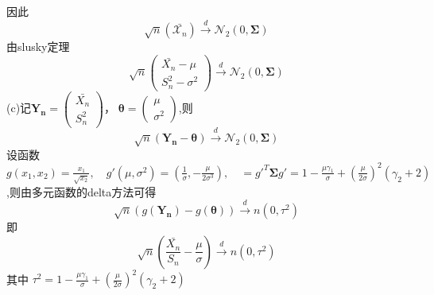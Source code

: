 \documentclass[11pt,a4paper]{ctexart}
\begin{document}
        因此\[\sqrt{n}(\bar{\mathcal{X}_n}) \overset{d}{\to} \mathcal{N}_2(0,\boldsymbol{\Sigma})\]
        由slusky定理\[\sqrt{n}\begin{pmatrix}
            \bar{X_n} - \mu\\
            S_n^2 - \sigma^2
            \end{pmatrix} \overset{d}{\to} \mathcal{N}_2(0,\boldsymbol{\Sigma})\]
        (c)记\(\boldsymbol{Y_n} = \begin{pmatrix}
                    \bar{X_n} \\
                    S_n^2
                    \end{pmatrix} ，\; \boldsymbol{\theta} = \begin{pmatrix}
                                        \mu \\
                                        \sigma^2
                                        \end{pmatrix}\),则
                                        \[ \sqrt{n}(\boldsymbol{Y_n} -\boldsymbol{\theta}) \overset{d}{\to}\mathcal{N}_2(0,\boldsymbol{\Sigma}) \]
            设函数\(\displaystyle g(x_1,x_2) = \frac{x_1}{\sqrt{x_2}}, \quad g'(\mu,\sigma^2) = (
            \frac{1}{\sigma},  -\frac{\mu}{2\sigma^3}
            ) ,\quad = g'^{T}\boldsymbol{\Sigma}g' =1 - \frac{\mu\gamma_1}{\sigma} + (\frac{\mu}{2\sigma})^2(\gamma_2 + 2) \),则由多元函数的delta方法可得
            \[\sqrt{n}(g(\boldsymbol{Y_n}) - g(\boldsymbol{\theta}) ) \overset{d}{\to} n(0,\tau^2)\]
            即\[ \sqrt{n}(\frac{\bar{X_n}}{S_n} - \frac{\mu}{\sigma}) \overset{d}{\to} n(0,\tau^2) \]
            其中 \( \tau^2 = 1 - \frac{\mu\gamma_1}{\sigma} + (\frac{\mu}{2\sigma})^2(\gamma_2 + 2) \)
            
\end{document}

